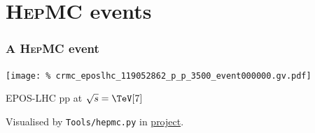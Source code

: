 \documentclass[compress,table,8pt]{beamer}
\newcommand\HepMC{{\scshape HepMC}}
\begin{document}
\section{\HepMC{} events}
\begin{frame}
  \frametitle{A \HepMC{} event}
  \begin{center}
    \texttt{[image: \%
      crmc\_eposlhc\_119052862\_p\_p\_3500\_event000000.gv.pdf]}
  \end{center}
  EPOS-LHC pp at $\sqrt{s}=\TeV[7]$

  {\footnotesize Visualised by \texttt{Tools/hepmc.py} in
    \href{https://github.com/cholmcc/O2Physics/tree/cholmcc_pwgmm_rivet/PWGMM/Rivet}{project}.}
\end{frame}
\end{document}

